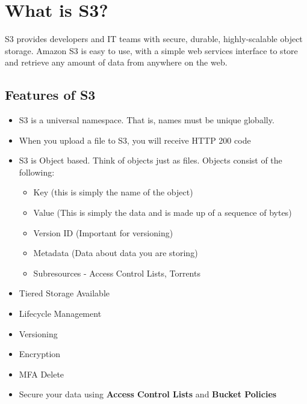 \documentclass{article}
\begin{document}
\section{What is S3?}

S3 provides developers and IT teams with secure, durable, highly-scalable object storage. Amazon S3 is easy to use, with a simple web services interface to store and retrieve any amount of data from anywhere on the web.

	\subsection{Features of S3} 
	\begin{itemize}
	\item
	S3 is a universal namespace. That is, names must be unique globally.
	
	\item
	When you upload a file to S3, you will receive HTTP 200 code
	
	\item
	S3 is Object based. Think of objects just as files. Objects consist of the 		following:
		\begin{itemize}
			\item
			Key (this is simply the name of the object)
			
			\item
			Value (This is simply the data and is made up of a sequence of 					bytes)
			
			\item
			Version ID (Important for versioning)
			
			\item
			Metadata (Data about data you are storing)
			
			\item
			Subresources - Access Control Lists, Torrents
		\end{itemize}
	
	\item
	Tiered Storage Available
	
	\item
	Lifecycle Management
	
	\item
	Versioning
	
	\item
	Encryption
	
	\item
	MFA Delete
	
	\item
	Secure your data using \textbf{Access Control Lists} and \textbf{Bucket 		Policies}
	\end{itemize}
\end{document}
